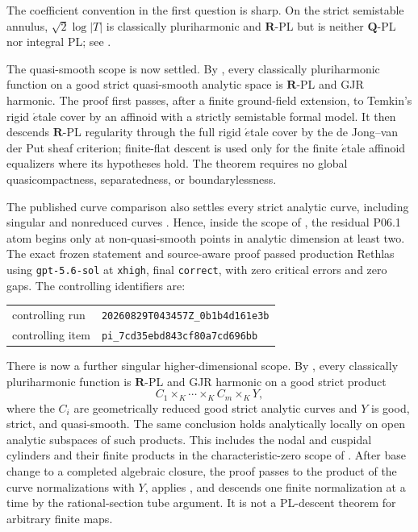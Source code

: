 The coefficient convention in the first question is sharp.  On the strict
semistable annulus, \(\sqrt2\log|T|\) is classically pluriharmonic and
\(\mathbf R\)-PL but is neither \(\mathbf Q\)-PL nor integral PL; see
.

The quasi-smooth scope is now settled.  By
, every classically pluriharmonic function
on a good strict quasi-smooth analytic space is \(\mathbf R\)-PL and GJR
harmonic.  The proof first passes, after a finite ground-field extension, to
Temkin's rigid \(\acute{e}\)tale cover by an affinoid with a strictly
semistable formal model.  It then descends \(\mathbf R\)-PL regularity through
the full rigid \(\acute{e}\)tale cover by the de Jong--van der Put sheaf
criterion; finite-flat descent is used only for the finite
\(\acute{e}\)tale affinoid equalizers where its hypotheses hold.  The theorem
requires no global quasicompactness, separatedness, or boundarylessness.

The published curve comparison also settles every strict analytic curve,
including singular and nonreduced curves
\cite[\S4.1.2 and Proposition~3.15]{GR25Classical}.  Hence, inside the scope
of , the residual P06.1 atom begins only at
non-quasi-smooth points in analytic dimension at least two.  The exact frozen
statement and source-aware proof passed production Rethlas using
\texttt{gpt-5.6-sol} at \texttt{xhigh}, final \texttt{correct}, with zero
critical errors and zero gaps.  The controlling identifiers are:
\begin{center}
\small
\begin{tabular}{@{}ll@{}}
controlling run & \nolinkurl{20260829T043457Z_0b1b4d161e3b}\\
controlling item & \nolinkurl{pi_7cd35ebd843cf80a7cd696bb}
\end{tabular}
\end{center}

There is now a further singular higher-dimensional scope.  By
, every classically pluriharmonic
function is \(\mathbf R\)-PL and GJR harmonic on a good strict product
\[
             C_1\times_K\cdots\times_K C_m\times_K Y,
\]
where the \(C_i\) are geometrically reduced good strict analytic curves and
\(Y\) is good, strict, and quasi-smooth.  The same conclusion holds
analytically locally on open analytic subspaces of such products.  This
includes the nodal and cuspidal cylinders and their finite products in the
characteristic-zero scope of .
After base change to a completed algebraic closure, the proof passes to the
product of the curve normalizations with \(Y\), applies
, and descends one finite normalization at
a time by the rational-section tube argument.  It is not a PL-descent
theorem for arbitrary finite maps.

